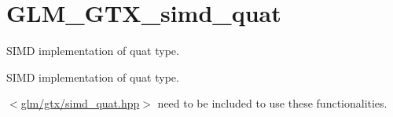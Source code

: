 \hypertarget{group__gtx__simd__quat}{}\section{G\+L\+M\+\_\+\+G\+T\+X\+\_\+simd\+\_\+quat}
\label{group__gtx__simd__quat}


S\+I\+MD implementation of quat type.  


S\+I\+MD implementation of quat type. 

$<$\hyperlink{simd__quat_8hpp}{glm/gtx/simd\+\_\+quat.\+hpp}$>$ need to be included to use these functionalities. 